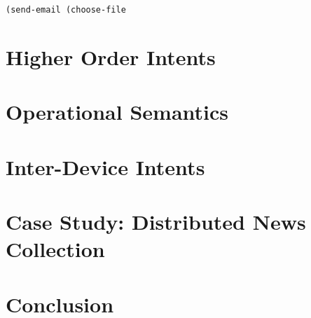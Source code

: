 \documentclass{acm_proc_article-sp}
\begin{document}
\begin{verbatim}
(send-email (choose-file
\end{verbatim}

\section{Higher Order Intents}

\section{Operational Semantics}

\section{Inter-Device Intents}

\section{Case Study: Distributed News Collection}

\section{Conclusion}
\end{document}
